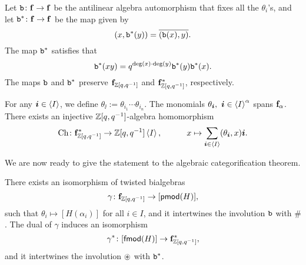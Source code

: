 Let $\mathtt{b}\colon\mathbf{f}\to\mathbf{f}$ be the antilinear algebra automorphism that fixes all the
$\theta_i$'s, and let $\mathtt{b}^*\colon\mathbf{f}\to\mathbf{f}$ be the map given by 
\[
    (x,\mathtt{b}^*(y))= \overline{(\mathtt{b}(x),y)}.
\] 
The map $\mathtt{b}^*$ satisfies that 
\[
    \mathtt{b}^*(xy)= q^{\deg(x)\cdot\deg(y)}\mathtt{b}^*(y)\mathtt{b}^*(x).
\] 
The maps $\mathtt{b}$ and $\mathtt{b}^*$ preserve
$\mathbf{f}_{\mathbb{Z}[q,q^{-1}]}$ and $\mathbf{f}_{\mathbb{Z}[q,q^{-1}]}^*$, respectively.

For any $\boldsymbol{i}\in\left<I\right>$, we define $\theta_{\ii} := \theta_{i_1}\cdots\theta_{i_n}$.
The monomials $\theta_{\ii},\ \ii\in\<I\>^\alpha$ spans $\mathbf{f}_\alpha$. There exists
an injective $\mathbb{Z}[q,q^{-1}]$-algebra homomorphism 
\[
    \operatorname{Ch}\colon \mathbf{f}_{\mathbb{Z}[q,q^{-1}]}^*
    \to\mathbb{Z}[q,q^{-1}]\left<I\right>,\hspace{3em} x\mapsto\sum_{\boldsymbol{i}\in\left<I\right>}(\theta_{\boldsymbol{i}},x)\boldsymbol{i}.
\]

We are now ready to give the statement to the algebraic categorification theorem.

\begin{theorem}[{\cite[Theorem 3.18]{KL1}}]\label{categorification}
    There exists an isomorphism of twisted bialgebras
    \begin{equation}\label{categorification-of-f}
        \gamma\colon\mathbf{f}_{\mathbb{Z}[q,q^{-1}]}\to[\mathsf{pmod}(H)],
    \end{equation} such that
    $\theta_i\mapsto[H(\alpha_i)]$ for all $i\in I$,
    and it intertwines the involution $\mathtt{b}$ with $\#$.
    The dual of $\gamma$ induces an isomorphism 
    \begin{equation}\label{categorification-of-f*}
        \gamma^*\colon[\mathsf{fmod}(H)]\to\mathbf{f}_{\mathbb{Z}[q,q^{-1}]}^*,
    \end{equation}
    and it intertwines the involution $\circledast$ with $\mathtt{b}^*$.
\end{theorem}

